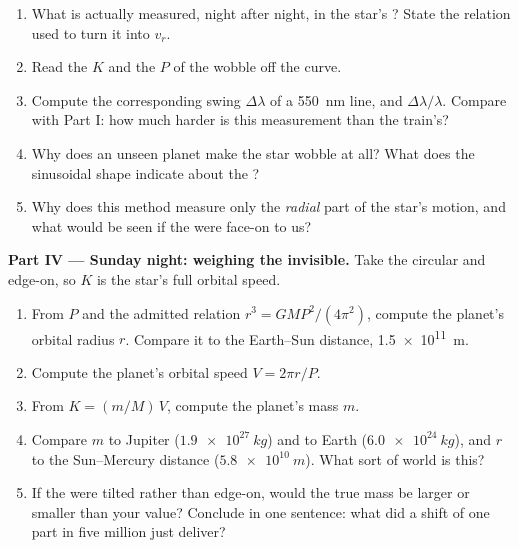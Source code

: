\begin{problem}
\begin{enumerate}[resume]
  \item What is actually measured, night after night, in the star's \emph{}? State
        the relation used to turn it into $v_r$.
  \item Read the  $K$ and the  $P$ of the wobble off the curve.
  \item Compute the corresponding swing $\Delta\lambda$ of a \qty{550}{nm} line, and
        $\Delta\lambda/\lambda$. Compare with Part I: how much harder is this measurement
        than the train's?
  \item Why does an unseen planet make the star wobble at all? What does the sinusoidal
        shape indicate about the ?
  \item Why does this method measure only the \emph{radial} part of the star's motion, and
        what would be seen if the  were face-on to us?
\end{enumerate}

\medskip
\noindent\textbf{Part IV --- Sunday night: weighing the invisible.}
Take the  circular and edge-on, so $K$ is the star's full orbital speed.
\begin{enumerate}[resume]
  \item From $P$ and the admitted relation $r^3 = G M P^2/(4\pi^2)$, compute the planet's
        orbital radius $r$. Compare it to the Earth--Sun distance, \qty{1.5e11}{m}.
  \item Compute the planet's orbital speed $V = 2\pi r/P$.
  \item From $K = (m/M)\,V$, compute the planet's mass $m$.
  \item Compare $m$ to Jupiter ($\qty{1.9e27}{kg}$) and to Earth ($\qty{6.0e24}{kg}$), and
        $r$ to the Sun--Mercury distance ($\qty{5.8e10}{m}$). What sort of world is this?
  \item If the  were tilted rather than edge-on, would the true mass be larger or
        smaller than your value? Conclude in one sentence: what did a  shift of one
        part in five million just deliver?
\end{enumerate}
\end{problem}
